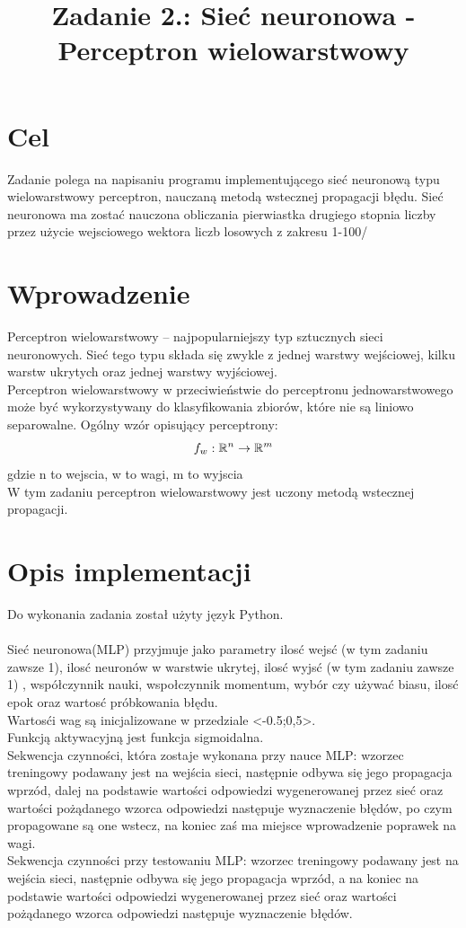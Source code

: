 \documentclass{classrep}
\author{%
  \studentinfo[210139@edu.p.lodz.pl]{Krzysztof Barden}{210139}
}
\title{Zadanie 2.: Sieć neuronowa - Perceptron wielowarstwowy}
\newcommand{\R}{\mathbb{R}}
\begin{document}
\maketitle
\thispagestyle{fancyplain}

\section{Cel}
{
Zadanie polega na napisaniu programu implementującego sieć neuronową typu wielowarstwowy perceptron, nauczaną metodą wstecznej propagacji błędu.
Sieć neuronowa ma zostać nauczona obliczania pierwiastka drugiego stopnia liczby przez użycie wejsciowego wektora liczb losowych z zakresu 1-100/

}

\section{Wprowadzenie}
{
Perceptron wielowarstwowy – najpopularniejszy typ sztucznych 
sieci neuronowych. Sieć tego typu składa się zwykle z jednej warstwy
 wejściowej, kilku warstw ukrytych oraz jednej warstwy wyjściowej.\\
Perceptron wielowarstwowy w przeciwieństwie do perceptronu jednowarstwowego 
może być wykorzystywany do klasyfikowania zbiorów, które nie są liniowo separowalne.
Ogólny wzór opisujący perceptrony:
\begin{equation}
f_w : \R ^n \rightarrow \R ^m\\
\end{equation}
gdzie n to wejscia, w to wagi, m to wyjscia\\ 
W tym zadaniu perceptron wielowarstwowy jest uczony metodą wstecznej propagacji.}

\section{Opis implementacji}
{Do wykonania zadania został użyty język Python.\\\\
Sieć neuronowa(MLP) przyjmuje jako parametry ilosć wejsć (w tym zadaniu zawsze 1), ilosć neuronów w warstwie ukrytej, ilosć wyjsć (w tym zadaniu zawsze 1)
, współczynnik nauki, wspołczynnik momentum, wybór czy używać biasu, ilosć epok oraz wartosć próbkowania błędu.\\
Wartosći wag są inicjalizowane w przedziale <-0.5;0,5>.\\
Funkcją aktywacyjną jest funkcja sigmoidalna.\\
Sekwencja czynności, która zostaje wykonana przy nauce MLP: wzorzec treningowy podawany jest na wejścia sieci, następnie odbywa się jego propagacja wprzód, dalej na podstawie wartości odpowiedzi wygenerowanej przez sieć oraz wartości pożądanego wzorca odpowiedzi następuje wyznaczenie błędów, po czym propagowane są one wstecz, na koniec zaś ma miejsce wprowadzenie poprawek na wagi.\\
Sekwencja czynności przy testowaniu MLP: wzorzec treningowy podawany jest na wejścia sieci, następnie odbywa się jego propagacja wprzód, a na koniec na podstawie wartości odpowiedzi wygenerowanej przez sieć oraz wartości pożądanego wzorca odpowiedzi następuje wyznaczenie błędów.
}
\end{document}
